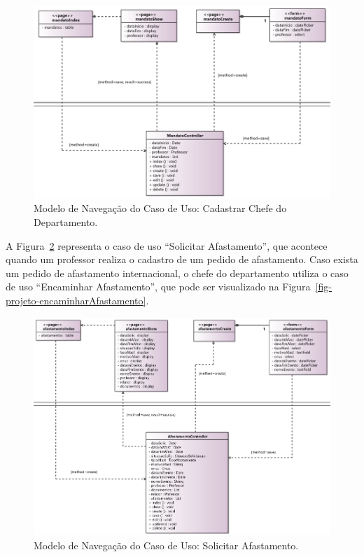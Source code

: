 \begin{figure}[!h]
	\centering
	\includegraphics[width=1\textwidth]{figuras/fig-projeto-cadastrarChefeDepartamento.png}
	\caption{Modelo de Navegação do Caso de Uso: Cadastrar Chefe do Departamento.}
	\label{fig-projeto-cadastrarChefeDepartamento}
\end{figure}

A Figura~\ref{fig-projeto-solicitarAfastamento} representa o caso de uso ``Solicitar Afastamento'', que acontece quando um professor realiza o cadastro de um pedido de afastamento. Caso exista um pedido de afastamento internacional, o chefe do departamento utiliza o caso de uso ``Encaminhar Afastamento'', que pode ser visualizado na Figura~\ref{fig-projeto-encaminharAfastamento}. 

\begin{figure}[!h]
	\centering
	\includegraphics[width=1\textwidth]{figuras/fig-projeto-solicitarAfastamento.png}
	\caption{Modelo de Navegação do Caso de Uso: Solicitar Afastamento.}
	\label{fig-projeto-solicitarAfastamento}
\end{figure}

